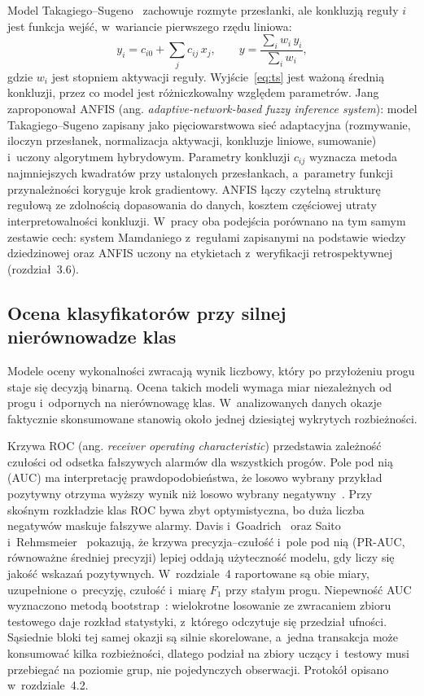 Model Takagiego--Sugeno~\cite{takagi_sugeno1985} zachowuje rozmyte przesłanki, ale konkluzją reguły
$i$ jest funkcja wejść, w~wariancie pierwszego rzędu liniowa:
\begin{equation}
  y_i = c_{i0} + \sum_{j} c_{ij}\, x_j ,
  \qquad
  y = \frac{\sum_i w_i\, y_i}{\sum_i w_i},
  \label{eq:ts}
\end{equation}
gdzie $w_i$ jest stopniem aktywacji reguły. Wyjście~\eqref{eq:ts} jest ważoną średnią konkluzji,
przez co model jest różniczkowalny względem parametrów. Jang~\cite{jang1993} zaproponował ANFIS
(ang. \emph{adaptive-network-based fuzzy inference system}): model Takagiego--Sugeno zapisany jako
pięciowarstwowa sieć adaptacyjna (rozmywanie, iloczyn przesłanek, normalizacja aktywacji,
konkluzje liniowe, sumowanie) i~uczony algorytmem hybrydowym. Parametry konkluzji $c_{ij}$
wyznacza metoda najmniejszych kwadratów przy ustalonych przesłankach, a~parametry funkcji
przynależności koryguje krok gradientowy. ANFIS łączy czytelną strukturę regułową ze zdolnością
dopasowania do danych, kosztem częściowej utraty interpretowalności konkluzji. W~pracy oba
podejścia porównano na tym samym zestawie cech: system Mamdaniego z~regułami zapisanymi na
podstawie wiedzy dziedzinowej oraz ANFIS uczony na etykietach z~weryfikacji retrospektywnej
(rozdział~3.6).

\subsection{Ocena klasyfikatorów przy silnej nierównowadze klas}

Modele oceny wykonalności zwracają wynik liczbowy, który po przyłożeniu progu staje się decyzją
binarną. Ocena takich modeli wymaga miar niezależnych od progu i~odpornych na nierównowagę klas.
W~analizowanych danych okazje faktycznie skonsumowane stanowią około jednej dziesiątej
wykrytych rozbieżności.

Krzywa ROC (ang. \emph{receiver operating characteristic}) przedstawia zależność czułości od odsetka
fałszywych alarmów dla wszystkich progów. Pole pod nią (AUC) ma interpretację prawdopodobieństwa,
że losowo wybrany przykład pozytywny otrzyma wyższy wynik niż losowo wybrany
negatywny~\cite{fawcett2006}. Przy skośnym rozkładzie klas ROC bywa zbyt optymistyczna, bo duża
liczba negatywów maskuje fałszywe alarmy. Davis i~Goadrich~\cite{davis_goadrich2006} oraz Saito
i~Rehmsmeier~\cite{saito_pr_auc} pokazują, że krzywa precyzja--czułość i~pole pod nią (PR-AUC,
równoważne średniej precyzji) lepiej oddają użyteczność modelu, gdy liczy się jakość wskazań
pozytywnych. W~rozdziale~4 raportowane są obie miary, uzupełnione o~precyzję, czułość i~miarę
$F_1$ przy stałym progu. Niepewność AUC wyznaczono metodą bootstrap~\cite{efron1979}:
wielokrotne losowanie ze zwracaniem zbioru testowego daje rozkład statystyki, z~którego
odczytuje się przedział ufności. Sąsiednie bloki tej samej okazji są silnie skorelowane, a~jedna
transakcja może konsumować kilka rozbieżności, dlatego podział na zbiory uczący i~testowy musi
przebiegać na poziomie grup, nie pojedynczych obserwacji. Protokół opisano w~rozdziale~4.2.

